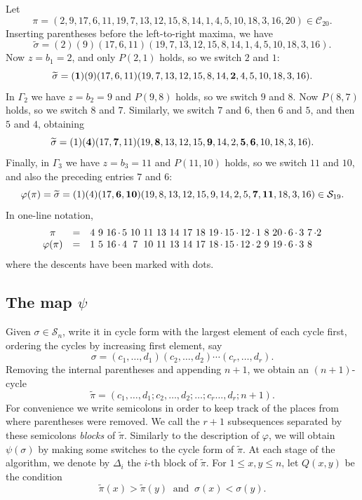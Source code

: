 \documentclass[11pt]{amsart}
\newcounter{Examplecount}
\newenvironment{example}[1][Example \arabic{Examplecount}.]{\vskip3pt \begin{trivlist}
\item[\hskip \labelsep {\bfseries #1}]}{\end{trivlist}\vskip2pt\stepcounter{Examplecount}}
\renewcommand\S{\mathcal S}
\newcommand\C{\mathcal C}
\newcommand\wt{\widetilde}
\newcommand\bij{\varphi}
\newcommand\inv{\psi}
\newcommand\sigm{\wt\sigma}
\newcommand\pim{\wt\pi}
\begin{document}
\begin{example}
Let $$\pi=(2,9,17,6,11,19,7,13,12,15,8,14,1,4,5,10,18,3,16,20)\in\C_{20}.$$
Inserting parentheses before the left-to-right maxima, we have
$$\sigm=(2)(9)(17,6,11)(19,7,13,12,15,8,14,1,4,5,10,18,3,16).$$
Now $z=b_1=2$, and only $P(2,1)$ holds, so we switch $2$ and $1$:
$$\sigm=({\bf 1})(9)(17,6,11)(19,7,13,12,15,8,14,{\bf 2},4,5,10,18,3,16).$$
In $\Gamma_2$ we have $z=b_2=9$ and $P(9,8)$ holds, so we switch $9$ and $8$.
Now $P(8,7)$ holds, so we switch $8$ and $7$. Similarly, we switch $7$ and $6$, then $6$ and $5$, and then $5$ and $4$, obtaining
$$\sigm=(1)({\bf 4})(17,{\bf 7},11)(19,{\bf 8},13,12,15,{\bf 9},14,2,{\bf 5},{\bf 6},10,18,3,16).$$
Finally, in $\Gamma_3$ we have $z=b_3=11$ and $P(11,10)$ holds, so we switch $11$ and $10$, and also the preceding entries $7$ and $6$:
$$\bij(\pi)=\sigm=(1)(4)(17,{\bf 6},{\bf 10})(19,8,13,12,15,9,14,2,5,{\bf 7},{\bf 11},18,3,16)\in\S_{19}.$$
In one-line notation,
\renewcommand{\tabcolsep}{0pt}
$$\begin{array}{cc*{2}{c@{\ }}c@{\,\cdot\,}*{7}{c@{\ }}*{3}{c@{\,\cdot\,}}*{2}{c@{\ }}*{2}{c@{\,\cdot\,}}c@{\ }c@{\,}c}
\pi&=&4&9&16&5&10&11&13&14&17&18&19&15&12&1&8&20&6&3&7&\cdot2\\
\bij(\pi)&=&1&5&16&4&7&10&11&13&14&17&18&15&12&2&9&19&6&3&8
\end{array}$$
where the descents have been marked with dots.
\end{example}

\subsection{The map $\inv$}

Given $\sigma\in\S_{n}$, write it in cycle form with the largest element of each cycle first, ordering the cycles by increasing first element,
say $$\sigma=(c_1,\dots,d_1)(c_2,\dots,d_2)\cdots(c_r,\dots,d_r).$$ Removing the internal parentheses and appending $n+1$, we obtain an $(n+1)$-cycle
$$\pim=(c_1,\dots,d_1;c_2,\dots,d_2;\dots;c_r\dots,d_r;n+1).$$ For convenience we write semicolons in order to keep track of the places from where parentheses were removed.
We call  the $r+1$ subsequences separated by these semicolons {\em blocks} of $\pim$.
Similarly to the description of $\bij$, we will obtain $\inv(\sigma)$ by making some switches to the cycle form of $\pim$.
At each stage of the algorithm, we denote by $\Delta_i$ the $i$-th block of $\pim$.
For $1\le x,y\le n$, let $Q(x,y)$ be the condition
$$\pim(x)>\pim(y) \ \textrm{ and }\ \sigma(x)<\sigma(y).$$
\end{document}
